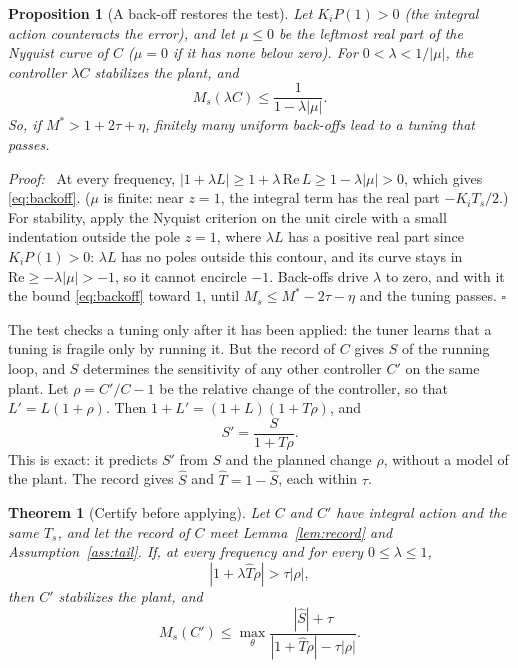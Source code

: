 \documentclass[letterpaper, 10 pt, conference]{ieeeconf}
\newtheorem{proposition}{Proposition}
\newtheorem{theorem}{Theorem}
\renewenvironment{proof}{\noindent\textit{Proof:}\ }{\hfill$\square$\par\smallskip}
\begin{document}
\begin{proposition}[A back-off restores the test]
\label{prop:backoff}
Let $K_iP(1)>0$ (the integral action counteracts the error), and let
$\mu\le0$ be the leftmost real part of the Nyquist curve of $C$
($\mu=0$ if it has none below zero). For $0<\lambda<1/|\mu|$, the
controller $\lambda C$ stabilizes the plant, and
\begin{equation}
M_s(\lambda C)\le\frac{1}{1-\lambda|\mu|}.
\label{eq:backoff}
\end{equation}
So, if $M^*>1+2\tau+\eta$, finitely many uniform back-offs lead to a
tuning that passes.
\end{proposition}

\begin{proof}
At every frequency, $|1+\lambda L|\ge1+\lambda\,\mathrm{Re}\,L\ge
1-\lambda|\mu|>0$, which gives \eqref{eq:backoff}. ($\mu$ is finite:
near $z=1$, the integral term has the real part $-K_iT_s/2$.) For
stability, apply the Nyquist criterion on the unit circle with a small
indentation outside the pole $z=1$, where $\lambda L$ has a positive real
part since $K_iP(1)>0$: $\lambda L$ has no poles outside this contour,
and its curve stays in $\mathrm{Re}\ge-\lambda|\mu|>-1$, so it cannot
encircle $-1$. Back-offs drive
$\lambda$ to zero, and with it the bound \eqref{eq:backoff} toward $1$,
until $M_s\le M^*-2\tau-\eta$ and the tuning passes.
\end{proof}

The test checks a tuning only after it has been applied: the tuner
learns that a tuning is fragile only by running it. But the record of
$C$ gives $S$ of the running loop, and $S$ determines the sensitivity of
any other controller $C'$ on the same plant. Let $\rho=C'/C-1$ be the
relative change of the controller, so that $L'=L(1+\rho)$. Then
$1+L'=(1+L)(1+T\rho)$, and
\begin{equation}
S'=\frac{S}{1+T\rho}.
\label{eq:predict}
\end{equation}
This is exact: it predicts $S'$ from $S$ and the planned change $\rho$,
without a model of the plant. The record gives $\hat S$ and
$\hat T=1-\hat S$, each within $\tau$.

\begin{theorem}[Certify before applying]
\label{thm:ahead}
Let $C$ and $C'$ have integral action and the same $T_s$, and let the
record of $C$ meet Lemma~\ref{lem:record} and Assumption~\ref{ass:tail}.
If, at every frequency and for every $0\le\lambda\le1$,
\begin{equation}
|1+\lambda\hat T\rho|>\tau|\rho|,
\label{eq:ahead}
\end{equation}
then $C'$ stabilizes the plant, and
\begin{equation}
M_s(C')\le\max_\theta\frac{|\hat S|+\tau}{|1+\hat T\rho|-\tau|\rho|}.
\label{eq:aheadbound}
\end{equation}
\end{theorem}
\end{document}
